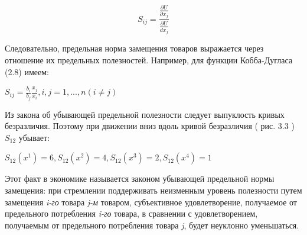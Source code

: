 \documentclass[12pt, 4paper]{book}
\begin{document}
{\begin{equation}
\label{formuala21}
S_{ij}=\frac{\frac{\partial U}{\partial x_j}}{\frac{\partial U}{d x_j}}
\end{equation}

Следовательно, предельная норма замещения товаров выражается через отношение их предельных полезностей. Например, для функции Кобба-Дугласа (2.8) имеем: 
\begin{center}
$S_{ij}=\frac{b_i}{b_j}\frac{x_j}{x_i}, i,j=1,...,n (i \neq j)$
\end{center}
\par

Из закона об убывающей предельной полезности следует выпуклость кривых безразличия. Поэтому при движении вниз вдоль кривой безразличия ( рис. 3.3 ) $S_{12}$ убывает:
\begin{center}
$S_{12}(x^1) = 6,S_{12}(x^2)=4, S_{12}(x^3)= 2, S_{12}(x^4)= 1 $
\end{center}

Этот факт в экономике называется законом убывающей предельной нормы замещения: при стремлении поддерживать неизменным уровень полезности путем замещения \textit{i-го} товара \textit{j-м} товаром, субъективное удовлетворение, получаемое от предельного потребления \textit{i-го} товара, в сравнении с удовлетворением, получаемым от предельного потребления товара \textit{j}, будет неуклонно уменьшаться. 
\par

}
\end{document}
